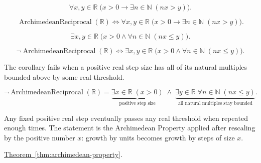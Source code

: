 \begin{remark*}
\[
\forall x,y\in\mathbb{R}\;\bigl(x>0\rightarrow \exists n\in\mathbb{N}\;(nx>y)\bigr).
\]
\end{remark*}

\begin{remark*}
\[
\operatorname{ArchimedeanReciprocal}(\mathbb{R})\Longleftrightarrow
\forall x,y\in\mathbb{R}\;\bigl(x>0\rightarrow \exists n\in\mathbb{N}\;(nx>y)\bigr).
\]
\end{remark*}

\begin{remark*}
\[
\exists x,y\in\mathbb{R}\;\bigl(x>0\land \forall n\in\mathbb{N}\;(nx\le y)\bigr).
\]
\end{remark*}

\begin{remark*}
\[
\neg\operatorname{ArchimedeanReciprocal}(\mathbb{R})\Longleftrightarrow
\exists x,y\in\mathbb{R}\;\bigl(x>0\land \forall n\in\mathbb{N}\;(nx\le y)\bigr).
\]
\end{remark*}

\begin{remark*}
The corollary fails when a positive real step size has all of its natural multiples bounded above by some real threshold.
\end{remark*}

\begin{remark*}
\[
\neg\operatorname{ArchimedeanReciprocal}(\mathbb{R})
=
\underbrace{\exists x\in\mathbb{R}\;(x>0)}_{\text{positive step size}}
\;\land\;
\underbrace{\exists y\in\mathbb{R}\;\forall n\in\mathbb{N}\;(nx\le y)}_{\text{all natural multiples stay bounded}}.
\]
\end{remark*}

\begin{remark*}[Interpretation]
Any fixed positive real step eventually passes any real threshold when repeated enough times. The statement is the Archimedean Property applied after rescaling by the positive number $x$: growth by units becomes growth by steps of size $x$.
\end{remark*}

\begin{dependencies}
\hyperref[thm:archimedean-property]{Theorem~\ref*{thm:archimedean-property}}.
\end{dependencies}

